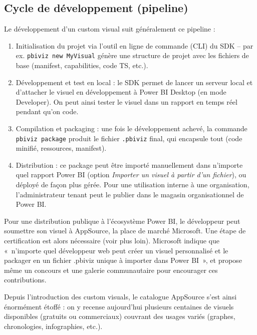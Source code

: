 \subsection*{Cycle de développement (pipeline)}
Le développement d’un custom visual suit généralement ce pipeline :
\begin{enumerate}
  \item Initialisation du projet via l’outil en ligne de commande (CLI) du SDK – par ex. \texttt{pbiviz new MyVisual} génère une structure de projet avec les fichiers de base (manifest, capabilities, code TS, etc.)\parencite{LearnMicrosoftSDK2}.
  \item Développement et test en local : le SDK permet de lancer un serveur local et d’attacher le visuel en développement à Power BI Desktop (en mode Developer). On peut ainsi tester le visuel dans un rapport en temps réel pendant qu’on code.
  \item Compilation et packaging : une fois le développement achevé, la commande \texttt{pbiviz package} produit le fichier \texttt{.pbiviz} final, qui encapsule tout (code minifié, ressources, manifest).
  \item Distribution : ce package peut être importé manuellement dans n’importe quel rapport Power BI (option \emph{Importer un visuel à partir d’un fichier}), ou déployé de façon plus gérée. Pour une utilisation interne à une organisation, l’administrateur tenant peut le publier dans le magasin organisationnel de Power BI\parencite{MediumSDK1}.
\end{enumerate}

Pour une distribution publique à l’écosystème Power BI, le développeur peut soumettre son visuel à AppSource, la place de marché Microsoft. Une étape de certification est alors nécessaire (voir plus loin). Microsoft indique que «~n’importe quel développeur web peut créer un visuel personnalisé et le packager en un fichier .pbiviz unique à importer dans Power BI~»\parencite{LearnMicrosoftSDK3}, et propose même un concours et une galerie communautaire pour encourager ces contributions\parencite{PowerBIMicrosoftCommunity}.

Depuis l’introduction des custom visuals, le catalogue AppSource s’est ainsi énormément étoffé : on y recense aujourd’hui plusieurs centaines de visuels disponibles (gratuits ou commerciaux) couvrant des usages variés (graphes, chronologies, infographies, etc.).

